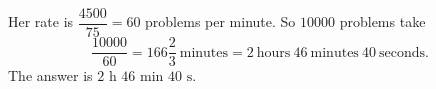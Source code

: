 Her rate is $\dfrac{4500}{75}=60$ problems per minute. So $10000$ problems take
\[\dfrac{10000}{60}=166\dfrac{2}{3}\ \text{minutes}=2\ \text{hours}\ 46\ \text{minutes}\ 40\ \text{seconds}.\]
The answer is $\boxed{2\text{ h }46\text{ min }40\text{ s}}$.
